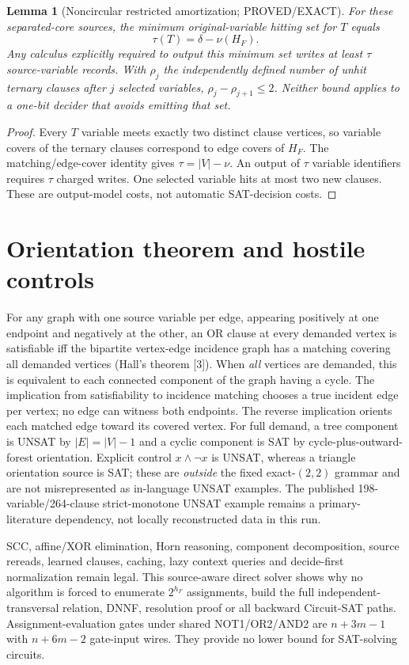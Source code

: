 \documentclass[11pt]{article}
\newtheorem{lemma}{Lemma}
\begin{document}
\begin{lemma}[Noncircular restricted amortization; PROVED/EXACT]
For these separated-core sources, the minimum original-variable hitting set for $T$ equals
\[
\tau(T)=\delta-\nu(H_F).
\]
Any calculus explicitly required to output this minimum set writes at least $\tau$ source-variable records. With $\rho_j$ the independently defined number of unhit ternary clauses after $j$ selected variables, $\rho_j-\rho_{j+1}\le2$. Neither bound applies to a one-bit decider that avoids emitting that set.
\end{lemma}
\begin{proof}
Every $T$ variable meets exactly two distinct clause vertices, so variable covers of the ternary clauses correspond to edge covers of $H_F$. The matching/edge-cover identity gives $\tau=|V|-\nu$. An output of $\tau$ variable identifiers requires $\tau$ charged writes. One selected variable hits at most two new clauses. These are output-model costs, not automatic SAT-decision costs.
\end{proof}

\section{Orientation theorem and hostile controls}
For any graph with one source variable per edge, appearing positively at one endpoint and negatively at the other, an OR clause at every demanded vertex is satisfiable iff the bipartite vertex-edge incidence graph has a matching covering all demanded vertices (Hall's theorem [3]). When \emph{all} vertices are demanded, this is equivalent to each connected component of the graph having a cycle. The implication from satisfiability to incidence matching chooses a true incident edge per vertex; no edge can witness both endpoints. The reverse implication orients each matched edge toward its covered vertex. For full demand, a tree component is UNSAT by $|E|=|V|-1$ and a cyclic component is SAT by cycle-plus-outward-forest orientation. Explicit control $x\wedge\neg x$ is UNSAT, whereas a triangle orientation source is SAT; these are \emph{outside} the fixed exact-$(2,2)$ grammar and are not misrepresented as in-language UNSAT examples. The published 198-variable/264-clause strict-monotone UNSAT example remains a primary-literature dependency, not locally reconstructed data in this run.

SCC, affine/XOR elimination, Horn reasoning, component decomposition, source rereads, learned clauses, caching, lazy context queries and decide-first normalization remain legal. This source-aware direct solver shows why no algorithm is forced to enumerate $2^{h_F}$ assignments, build the full independent-transversal relation, DNNF, resolution proof or all backward Circuit-SAT paths. Assignment-evaluation gates under shared NOT1/OR2/AND2 are $n+3m-1$ with $n+6m-2$ gate-input wires. They provide no lower bound for SAT-solving circuits.
\end{document}
